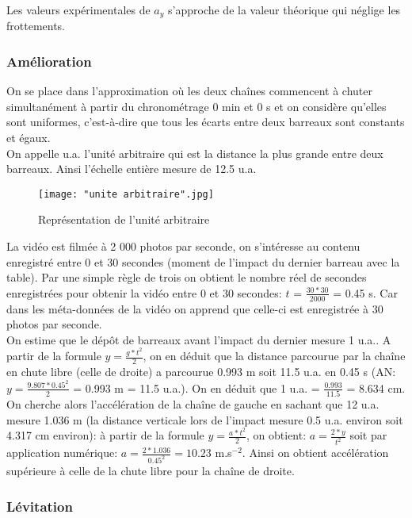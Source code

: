 \documentclass{scrartcl}
\begin{document}
			\noindent Les valeurs expérimentales de $a_y$ s'approche de la valeur théorique qui néglige les frottements.
			
			\subsubsection{Amélioration}
			
				On se place dans l'approximation où les deux chaînes commencent à chuter simultanément à partir du chronométrage 0 min et 0 s et on considère qu'elles sont uniformes, c'est-à-dire que tous les écarts entre deux barreaux sont constants et égaux.\\
				On appelle u.a. l'unité arbitraire qui est la distance la plus grande entre deux barreaux. Ainsi l'échelle entière mesure de 12.5 u.a.
				
			\begin{figure}[ht!]
				\centering
				\texttt{[image: "unite arbitraire".jpg]}
				\caption{Représentation de l'unité arbitraire}
			\end{figure}
			
			\noindent La vidéo est filmée à 2 000 photos par seconde, on s'intéresse au contenu enregistré entre 0 et 30 secondes (moment de l'impact du dernier barreau avec la table). Par une simple règle de trois on obtient le nombre réel de secondes enregistrées pour obtenir la vidéo entre 0 et 30 secondes: $t$ = $\frac{30 * 30}{2000}$ = 0.45 s. Car dans les méta-données de la vidéo on apprend que celle-ci est enregistrée à 30 photos par seconde.\\
			On estime que le dépôt de barreaux avant l'impact du dernier mesure 1 u.a.. A partir de la formule $y = \frac{g*t^2}{2}$, on en déduit que la distance parcourue par la chaîne en chute libre (celle de droite) a parcourue 0.993 m soit 11.5 u.a. en 0.45 s (AN: $y = \frac{9.807 * 0.45^2}{2}$ = 0.993 m = 11.5 u.a.). On en déduit que 1 u.a. = $\frac{0.993}{11.5}$ = 8.634 cm.\\
			On cherche alors l'accélération de la chaîne de gauche en sachant que 12 u.a. mesure 1.036 m (la distance verticale lors de l'impact mesure 0.5 u.a. environ soit 4.317 cm environ): à partir de la formule $y = \frac{a*t^2}{2}$, on obtient: $a = \frac{2 * y}{t^2}$ soit par application numérique: $a = \frac{2 * 1.036}{0.45^2} = 10.23$ m.s$^{-2}$. Ainsi on obtient accélération supérieure à celle de la chute libre pour la chaîne de droite.
			
			\subsubsection{Lévitation}
			
\end{document}
